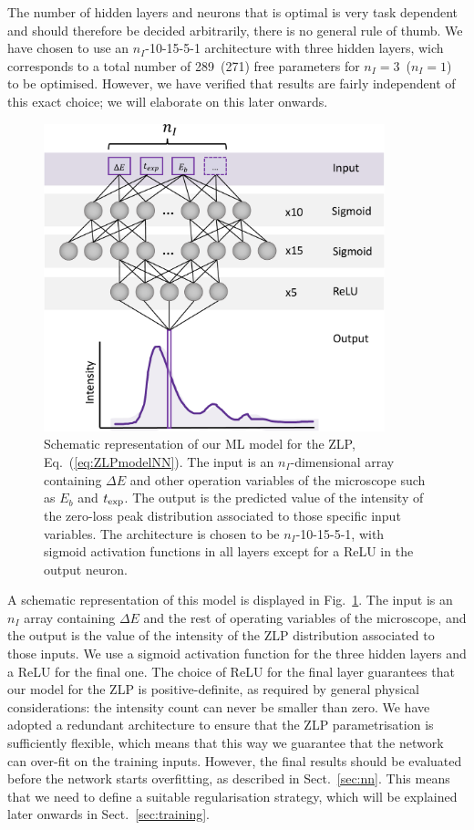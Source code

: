 The number of hidden layers and neurons that is optimal is very task dependent and
should therefore be decided arbitrarily, 
there is no general rule of thumb. 
%
We have chosen to use an $n_I$-10-15-5-1 architecture with three hidden layers, wich corresponds to a total
number of 289~(271) free parameters for $n_I=3$~($n_I=1$) to be optimised.
%
However, we have verified that results are fairly independent of this exact choice;
we will elaborate on this later onwards.
  
\begin{figure}[H]
    \centering
    \includegraphics[width=99mm]{plots/architecture.pdf}
    \caption{Schematic representation of our ML model for the ZLP, Eq.~(\ref{eq:ZLPmodelNN}).
      The input is an $n_I$-dimensional array containing $\Delta E$ and other
      operation variables of the microscope such as $E_b$ and $t_{\rm exp}$.
      The output is the predicted value of the intensity of the zero-loss peak
      distribution associated to those specific input variables.
      The architecture is chosen to be $n_I$-10-15-5-1, with sigmoid activation functions
      in all layers except for a ReLU in the output neuron.
    }
    \label{fig:architecture}
\end{figure}

A schematic representation of this model
is displayed in Fig.~\ref{fig:architecture}.
%
 The input is an $n_I$ array containing $\Delta E$ and the rest of
 operating variables of the microscope, and
 the output is the value of the intensity of the ZLP distribution
 associated to those inputs.
 We use a sigmoid activation function for the three hidden layers and a ReLU
 for the final one.
 The choice of ReLU for the final layer guarantees that our model for the ZLP
 is positive-definite, as required by general physical considerations: the intensity
 count can never be smaller than zero.
 We have adopted a redundant architecture to ensure that the ZLP parametrisation
 is sufficiently flexible, which means that this way we guarantee that
 the network can over-fit on the training inputs.
 However, the final results should be evaluated before the network starts overfitting,
 as described in Sect.~\ref{sec:nn}. 
 This means that we need to define a suitable regularisation strategy, which 
 will be explained later onwards in Sect.~\ref{sec:training}.


